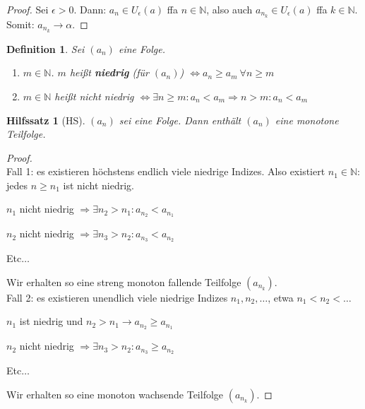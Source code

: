 \documentclass[titlepage,ngerman,a4paper,headsepline]{scrartcl}
\newcommand{\N}{\mathbb{N}}
\theoremstyle{named}
\theoremstyle{dotless}
\newtheorem*{definition}{Definition}
\newtheorem*{hilfssatz*}{Hilfssatz}
\begin{document}
\begin{proof}
	Sei $\epsilon > 0$. Dann: $a_{n} \in U_{\epsilon}(a)$ ffa $n \in \N$, also auch $a_{n_{k}} \in U_{\epsilon}(a)$ ffa $k \in \N$. Somit: $a_{n_{k}} \rightarrow \alpha$.
\end{proof}

\begin{definition} Sei $(a_{n})$ eine Folge. 
	\begin{enumerate}
		\item $m \in \N$. $m$ hei{\ss}t \textbf{niedrig} (für $(a_{n})$) $\iff a_{n} \geq a_{m} ~\forall n \geq m $
		\item $m \in \N$ hei{\ss}t nicht niedrig $\iff \exists n \geq m: a_{n} < a_{m} \Rightarrow n > m: a_{n} < a_{m}$
	\end{enumerate}
\end{definition}


\begin{hilfssatz*}[HS]
	$(a_{n})$ sei eine Folge. Dann enthält $(a_{n})$ eine monotone Teilfolge.	
\end{hilfssatz*}

\begin{proof} ~\\
	Fall 1: es existieren höchstens endlich viele niedrige Indizes. Also existiert $n_{1} \in \N$: jedes $n \geq n_{1}$ ist nicht niedrig.
	\begin{description}
		\item $n_{1}$ nicht niedrig $\Rightarrow \exists n_{2} > n_{1} : a_{n_{2}} < a_{n_{1}}$
		\item $n_{2}$ nicht niedrig $\Rightarrow \exists n_{3} > n_{2} : a_{n_{3}} < a_{n_{2}}$
		\item Etc$\dotsc$
	\end{description}
	Wir erhalten so eine streng monoton fallende Teilfolge $(a_{n_{k}})$. \\
	Fall 2: es existieren unendlich viele niedrige Indizes $n_{1}, n_{2}, \dotsc$, etwa $n_{1} < n_{2} < \dotsc$
	\begin{description}
		\item $n_{1}$ ist niedrig und $n_{2} > n_{1} \rightarrow a_{n_{2}} \geq a_{n_{1}}$
		\item $n_{2}$ nicht niedrig $\Rightarrow \exists n_{3} > n_{2} : a_{n_{3}} \geq a_{n_{2}}$
		\item Etc$\dotsc$
	\end{description}
	Wir erhalten so eine monoton wachsende Teilfolge $(a_{n_{k}})$.
\end{proof}
\end{document}
